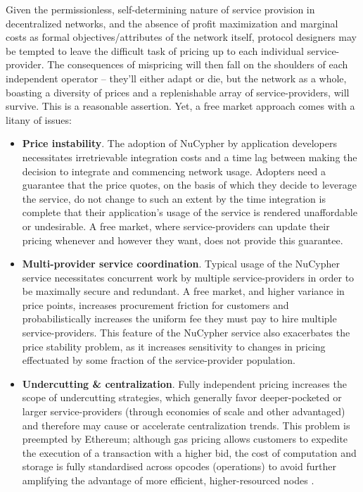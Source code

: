 \documentclass[longbibliography,nofootinbib]{revtex4-1}
\begin{document}
Given the permissionless, self-determining nature of service provision in decentralized networks, and the absence of profit maximization and marginal costs as formal objectives/attributes of the network itself, protocol designers may be tempted to leave the difficult task of pricing up to each individual service-provider. The consequences of mispricing will then fall on the shoulders of each independent operator – they’ll either adapt or die, but the network as a whole, boasting a diversity of prices and a replenishable array of service-providers, will survive. This is a reasonable assertion. Yet, a free market approach comes with a litany of issues: 
\begin{itemize}
    \item \textbf{Price instability}. The adoption of NuCypher by application developers necessitates irretrievable integration costs and a time lag between making the decision to integrate and commencing network usage. Adopters need a guarantee that the price quotes, on the basis of which they decide to leverage the service, do not change to such an extent by the time integration is complete that their application’s usage of the service is rendered unaffordable or undesirable. A free market, where service-providers can update their pricing whenever and however they want, does not provide this guarantee. 
    \item \textbf{Multi-provider service coordination}. Typical usage of the NuCypher service necessitates concurrent work by multiple service-providers in order to be maximally secure and redundant. A free market, and higher variance in price points, increases procurement friction for customers and probabilistically increases the uniform fee they must pay to hire multiple service-providers. This feature of the NuCypher service also exacerbates the price stability problem, as it increases sensitivity to changes in pricing effectuated by some fraction of the service-provider population.
    \item \textbf{Undercutting \& centralization}.  Fully independent pricing increases the scope of undercutting strategies, which generally favor deeper-pocketed or larger service-providers (through economies of scale and other advantaged) and therefore may cause or accelerate centralization trends. This problem is preempted by Ethereum; although gas pricing allows customers to expedite the execution of a transaction with a higher bid, the cost of computation and storage is fully standardised across opcodes (operations) to avoid further amplifying the advantage of more efficient, higher-resourced nodes \cite{ethgas}. 

\end{itemize}
\end{document}

